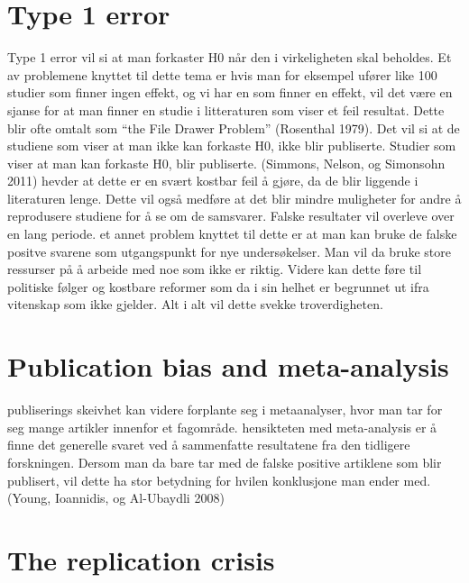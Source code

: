 \documentclass[
  12pt,
  norsk,
]{article}
\begin{document}
\hypertarget{type-1-error}{%
\section{\texorpdfstring{\textbf{Type 1
error}}{Type 1 error}}\label{type-1-error}}

Type 1 error vil si at man forkaster H0 når den i virkeligheten skal
beholdes. Et av problemene knyttet til dette tema er hvis man for
eksempel ufører like 100 studier som finner ingen effekt, og vi har en
som finner en effekt, vil det være en sjanse for at man finner en studie
i litteraturen som viser et feil resultat. Dette blir ofte omtalt som
``the File Drawer Problem'' (Rosenthal 1979). Det vil si at de studiene
som viser at man ikke kan forkaste H0, ikke blir publiserte. Studier som
viser at man kan forkaste H0, blir publiserte. (Simmons, Nelson, og
Simonsohn 2011) hevder at dette er en svært kostbar feil å gjøre, da de
blir liggende i literaturen lenge. Dette vil også medføre at det blir
mindre muligheter for andre å reprodusere studiene for å se om de
samsvarer. Falske resultater vil overleve over en lang periode. et annet
problem knyttet til dette er at man kan bruke de falske positve svarene
som utgangspunkt for nye undersøkelser. Man vil da bruke store ressurser
på å arbeide med noe som ikke er riktig. Videre kan dette føre til
politiske følger og kostbare reformer som da i sin helhet er begrunnet
ut ifra vitenskap som ikke gjelder. Alt i alt vil dette svekke
troverdigheten.

\hypertarget{publication-bias-and-meta-analysis}{%
\section{\texorpdfstring{\textbf{Publication bias and
meta-analysis}}{Publication bias and meta-analysis}}\label{publication-bias-and-meta-analysis}}

publiserings skeivhet kan videre forplante seg i metaanalyser, hvor man
tar for seg mange artikler innenfor et fagområde. hensikteten med
meta-analysis er å finne det generelle svaret ved å sammenfatte
resultatene fra den tidligere forskningen. Dersom man da bare tar med de
falske positive artiklene som blir publisert, vil dette ha stor
betydning for hvilen konklusjone man ender med.(Young, Ioannidis, og
Al-Ubaydli 2008)

\hypertarget{the-replication-crisis}{%
\section{\texorpdfstring{\textbf{The replication
crisis}}{The replication crisis}}\label{the-replication-crisis}}
\end{document}
